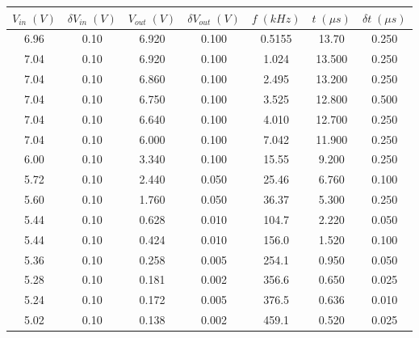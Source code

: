 \begin{tabular}{cc|cc|ccc}
\toprule
$V_{in} \; (V)$ & $\delta V_{in} \; (V)$ & $V_{out} \; (V)$ & $\delta V_{out} \; (V)$ & $f \; (kHz)$ & $t \; (\mu s)$ & $\delta t \; (\mu s)$ \\
\midrule
           6.96 &                    0.10 &            6.920 &                   0.100 &       0.5155 &       13.70 &                 0.250 \\
           7.04 &                    0.10 &            6.920 &                   0.100 &       1.024 &        13.500&                 0.250 \\
           7.04 &                    0.10 &            6.860 &                   0.100 &       2.495 &        13.200&                 0.250 \\
           7.04 &                    0.10 &            6.750 &                   0.100 &       3.525 &        12.800&                 0.500 \\
           7.04 &                    0.10 &            6.640 &                   0.100 &       4.010 &        12.700 &                 0.250 \\
           7.04 &                    0.10 &            6.000 &                   0.100 &       7.042 &        11.900 &                 0.250 \\
           6.00 &                    0.10 &            3.340 &                   0.100 &      15.55 &         9.200 &                 0.250 \\
           5.72 &                    0.10 &            2.440 &                   0.050 &      25.46 &         6.760 &                 0.100 \\
           5.60 &                    0.10 &            1.760 &                   0.050 &      36.37 &         5.300 &                 0.250 \\
           5.44 &                    0.10 &            0.628 &                   0.010 &     104.7 &          2.220 &                 0.050 \\
           5.44 &                    0.10 &            0.424 &                   0.010 &     156.0 &          1.520 &                 0.100 \\
           5.36 &                    0.10 &            0.258 &                   0.005 &     254.1 &          0.950 &                 0.050 \\
           5.28 &                    0.10 &            0.181 &                   0.002 &     356.6 &          0.650 &                 0.025 \\
           5.24 &                    0.10 &            0.172 &                   0.005 &     376.5 &          0.636 &                 0.010 \\
           5.02 &                    0.10 &            0.138 &                   0.002 &     459.1 &          0.520 &                 0.025 \\
\bottomrule
\end{tabular}
